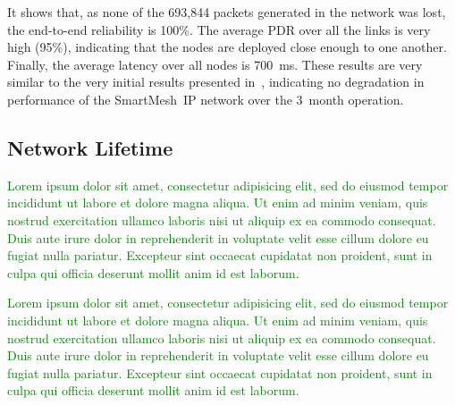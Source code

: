\documentclass{elsarticle}
\newcommand{\lorem}          {\textcolor{green}{Lorem ipsum dolor sit amet, consectetur adipisicing elit, sed do eiusmod tempor incididunt ut labore et dolore magna aliqua. Ut enim ad minim veniam, quis nostrud exercitation ullamco laboris nisi ut aliquip ex ea commodo consequat. Duis aute irure dolor in reprehenderit in voluptate velit esse cillum dolore eu fugiat nulla pariatur. Excepteur sint occaecat cupidatat non proident, sunt in culpa qui officia deserunt mollit anim id est laborum.}}
\newcommand{\smip}                {SmartMesh~IP\xspace}
\begin{document}
It shows that, as none of the 693,844 packets generated in the network was lost, the end-to-end reliability is 100\%.
The average PDR over all the links is very high (95\%), indicating that the nodes are deployed close enough to one another.
Finally, the average latency over all nodes is 700~ms.
These results are very similar to the very initial results presented in~\cite{watteyne16peach}, indicating no degradation in performance of the \smip network over the 3~month operation.

\subsection{Network Lifetime}
\label{sec:lifetime}


\lorem


\lorem
\end{document}

